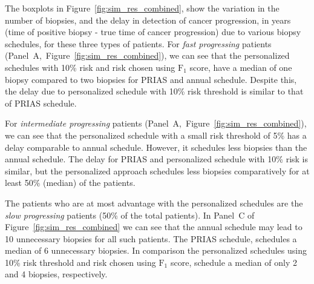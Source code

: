 The boxplots in Figure~\ref{fig:sim_res_combined}, show the variation in the number of biopsies, and the delay in detection of cancer progression, in years (time of positive biopsy - true time of cancer progression) due to various biopsy schedules, for these three types of patients. For \textit{fast progressing} patients (Panel~A,~Figure~\ref{fig:sim_res_combined}), we can see that the personalized schedules with 10\% risk and risk chosen using $\mbox{F}_1$ score, have a median of one biopsy compared to two biopsies for PRIAS and annual schedule. Despite this, the delay due to personalized schedule with 10\% risk threshold is similar to that of PRIAS schedule. 

For \textit{intermediate progressing} patients (Panel~A,~Figure~\ref{fig:sim_res_combined}), we can see that the personalized schedule with a small risk threshold of 5\% has a delay comparable to annual schedule. However, it schedules less biopsies than the annual schedule. The delay for PRIAS and personalized schedule with 10\% risk is similar, but the personalized approach schedules less biopsies comparatively for at least 50\% (median) of the patients.

The patients who are at most advantage with the personalized schedules are the \textit{slow progressing} patients (50\% of the total patients). In Panel~C of Figure~\ref{fig:sim_res_combined} we can see that the annual schedule may lead to 10 unnecessary biopsies for all such patients. The PRIAS schedule, schedules a median of 6 unnecessary biopsies. In comparison the personalized schedules using 10\% risk threshold and risk chosen using $\mbox{F}_1$ score, schedule a median of only 2 and 4 biopsies, respectively.
